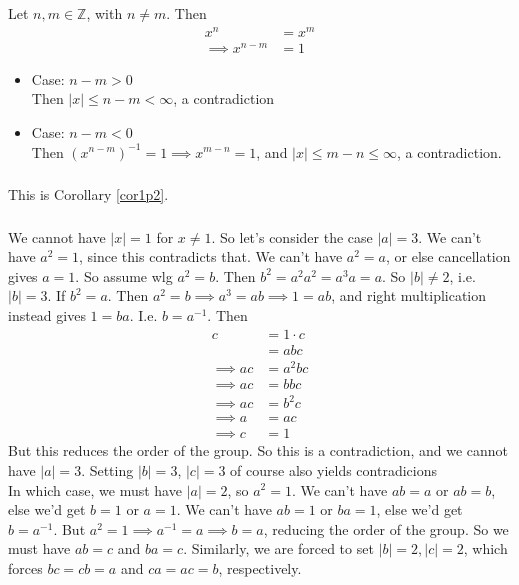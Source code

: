 \documentclass{article}
\newcommand{\ints}{\mathbb{Z}}
\newcommand{\inv}[1]{ {#1}^{-1} }
\begin{document}
\subsubsection{}
Let $n,m \in \ints$, with $n \neq m$. Then 
\begin{align*}
x^n &= x^m\\
\implies x^{n-m} &=1
\end{align*}
\begin{itemize}
\item Case: $n-m > 0$\\
Then $|x| \leq n-m < \infty$, a contradiction
\item Case: $n-m < 0$\\
Then $(x^{n-m})^{-1} = 1 \implies x^{m-n} = 1$, and $|x| \leq m-n \leq \infty$, a contradiction.
\end{itemize}
\subsubsection{}
This is Corollary \ref{cor1p2}.
\subsubsection{}
We cannot have $|x| = 1$ for $x \neq 1$. So let's consider the case $|a| = 3$. We can't have $a^2 = 1$, since this contradicts that. We can't have $a^2 = a$, or else cancellation gives $a=1$. So assume wlg $a^2 = b$. Then $b^2 = a^2a^2 = a^3a = a$. So $|b| \neq 2$, i.e. $|b| = 3$. If $b^2=a$. Then $a^2 = b \implies a^3 = ab \implies 1 = ab$, and right multiplication instead gives $1=ba$. I.e. $b=\inv{a}$. Then
\begin{align*}
c &= 1\cdot c\\
&= abc\\
\implies ac &= a^2bc\\
\implies ac &= bbc\\
\implies ac &= b^2c\\
\implies a &= ac\\
\implies c &= 1 
\end{align*}
But this reduces the order of the group. So this is a contradiction, and we cannot have $|a| = 3$. Setting $|b|=3$, $|c|=3$ of course also yields contradicions\\
In which case, we must have $|a|=2$, so $a^2=1$. We can't have $ab=a$ or $ab=b$, else we'd get $b=1$ or $a=1$. We can't have $ab=1$ or $ba=1$, else we'd get $b=\inv{a}$. But $a^2=1 \implies \inv{a}=a \implies b = a$, reducing the order of the group. So we must have $ab=c$ and $ba=c$. Similarly, we are forced to set $|b|=2, |c|=2$, which forces $bc=cb=a$ and $ca=ac=b$, respectively. 
\end{document}
